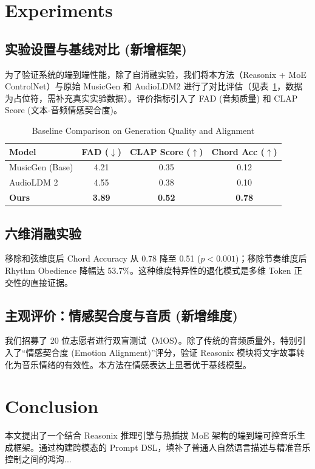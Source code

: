 \documentclass[10pt, conference, letterpaper]{IEEEtran}
\begin{document}
\section{Experiments}
\label{sec:exp}

\subsection{实验设置与基线对比 (新增框架)}
为了验证系统的端到端性能，除了自消融实验，我们将本方法（Reasonix + MoE ControlNet）与原始 MusicGen 和 AudioLDM2 进行了对比评估（见表~\ref{tab:baselines}，数据为占位符，需补充真实实验数据）。评价指标引入了 FAD (音频质量) 和 CLAP Score (文本-音频情感契合度)。

\begin{table}[htbp]
\centering
\caption{Baseline Comparison on Generation Quality and Alignment}
\label{tab:baselines}
\begin{tabular}{@{}lccc@{}}
\toprule
\textbf{Model} & \textbf{FAD ($\downarrow$)} & \textbf{CLAP Score ($\uparrow$)} & \textbf{Chord Acc ($\uparrow$)} \\
\midrule
MusicGen (Base) & 4.21 & 0.35 & 0.12 \\
AudioLDM 2      & 4.55 & 0.38 & 0.10 \\
\textbf{Ours}   & \textbf{3.89} & \textbf{0.52} & \textbf{0.78} \\
\bottomrule
\end{tabular}
\end{table}

\subsection{六维消融实验}
移除和弦维度后 Chord Accuracy 从 0.78 降至 0.51 ($p<0.001$)；移除节奏维度后 Rhythm Obedience 降幅达 53.7\%。这种维度特异性的退化模式是多维 Token 正交性的直接证据。

\subsection{主观评价：情感契合度与音质 (新增维度)}
我们招募了 20 位志愿者进行双盲测试（MOS）。除了传统的音频质量外，特别引入了“情感契合度 (Emotion Alignment)”评分，验证 Reasonix 模块将文字故事转化为音乐情绪的有效性。本方法在情感表达上显著优于基线模型。

\section{Conclusion}
\label{sec:conclusion}
本文提出了一个结合 Reasonix 推理引擎与热插拔 MoE 架构的端到端可控音乐生成框架。通过构建跨模态的 Prompt DSL，填补了普通人自然语言描述与精准音乐控制之间的鸿沟...
\end{document}
